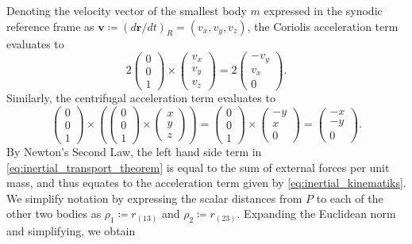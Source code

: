 Denoting the velocity vector of the smallest body $m$ expressed in the synodic reference frame as $\boldsymbol{v} \coloneq (d \boldsymbol{r}/dt)_R = (v_x, v_y, v_z)$, the Coriolis acceleration term evaluates to
\[
2
\begin{pmatrix}
0 \\
0 \\
1
\end{pmatrix}
\times
\begin{pmatrix}
v_x \\
v_y \\
v_z
\end{pmatrix}
=
2
\begin{pmatrix}
-v_y \\
v_x \\
0
\end{pmatrix}.
\]
Similarly, the centrifugal acceleration term evaluates to
\[
\begin{pmatrix}
0 \\
0 \\
1
\end{pmatrix}
\times
\left(
\begin{pmatrix}
0 \\
0 \\
1
\end{pmatrix}
\times
\begin{pmatrix}
x \\
y \\
z
\end{pmatrix}
\right)
=
\begin{pmatrix}
0 \\
0 \\
1
\end{pmatrix}
\times
\begin{pmatrix}
-y \\
x \\
0
\end{pmatrix}
=
\begin{pmatrix}
-x \\
-y \\
0
\end{pmatrix}.
\]
By Newton's Second Law, the left hand side term in \eqref{eq:inertial_transport_theorem} is equal to the sum of external forces per unit mass, and thus equates to the acceleration term given by \eqref{eq:inertial_kinematiks}. We simplify notation by expressing the scalar distances from $P$ to each of the other two bodies as $\rho_1 \coloneq r_{(13)}$ and $\rho_2 \coloneq r_{(23)}$. Expanding the Euclidean norm and simplifying, we obtain
